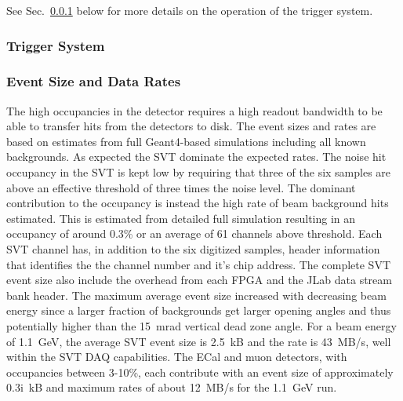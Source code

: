 See Sec.~\ref{sec:triggerdaq} below for more details on the operation of the trigger system.






\subsubsection{Trigger System}
\label{sec:triggerdaq}


\subsubsection{Event Size and Data Rates}

The high occupancies in the detector requires a high readout bandwidth to be able to transfer hits from the 
detectors to disk. The event sizes and rates are based on estimates from full Geant4-based simulations 
including all known backgrounds. As expected the SVT dominate the expected rates. 
The noise hit occupancy in the SVT is kept low by requiring that three of the six samples are above an
effective threshold of three times the noise level. The dominant contribution to the occupancy is instead 
the high rate of beam background hits estimated. This is estimated 
from detailed full simulation resulting in an occupancy of around 0.3\% or an average of 61 channels above threshold.  
Each SVT channel has, in addition to the six digitized samples,  header information that identifies the 
the channel number and it's chip address. The complete SVT event size also 
include the overhead from each FPGA and the JLab data stream bank header.  
The maximum average event size increased with decreasing beam energy since a larger 
fraction of backgrounds get larger opening angles and thus potentially higher than the 15~mrad 
vertical dead zone angle. For a beam energy of 1.1~GeV, the average SVT event size is 2.5~kB and 
the rate is 43~MB/s, well within the SVT DAQ capabilities. 
The ECal and muon detectors, with occupancies between 3-10\%, each contribute with an event size of 
approximately 0.3i~kB and maximum rates of about 12~MB/s for the 1.1~GeV run. 
